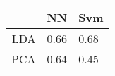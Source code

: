 \begin{tabular}{|r|l|l|}
  \hline
    & NN & Svm \\
  \hline
  LDA & 0.66 & 0.68 \\
  \hline
  PCA & 0.64 & 0.45 \\
  \hline
\end{tabular}
